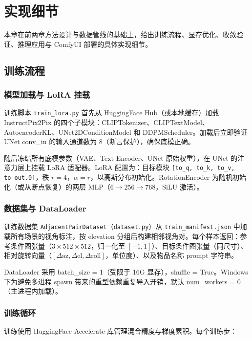 \chapter{实现细节}

本章在前两章方法设计与数据管线的基础上，给出训练流程、显存优化、收敛验证、推理应用与 ComfyUI 部署的具体实现细节。

\section{训练流程}

\subsection{模型加载与 LoRA 挂载}

训练脚本 \texttt{train\_lora.py} 首先从 HuggingFace Hub（或本地缓存）加载 InstructPix2Pix 的四个子模块：CLIPTokenizer、CLIPTextModel、AutoencoderKL、UNet2DConditionModel 和 DDPMScheduler。加载后立即验证 UNet conv\_in 的输入通道数为 8（断言保护），确保底模正确。

随后冻结所有底模参数（VAE、Text Encoder、UNet 原始权重），在 UNet 的注意力层上挂载 LoRA 适配器。LoRA 配置为：目标模块 \texttt{[to\_q, to\_k, to\_v, to\_out.0]}，秩 $r = 4$，$\alpha = r$，以高斯分布初始化。RotationEncoder 为随机初始化（或从断点恢复）的两层 MLP（$6 \to 256 \to 768$，SiLU 激活）。

\subsection{数据集与 DataLoader}

训练数据集 \texttt{AdjacentPairDataset}（\texttt{dataset.py}）从 \texttt{train\_manifest.json} 中加载所有场景的视角标注，按 elevation 分组后构建相邻视角对。每个样本返回：参考条件图张量（$3 \times 512 \times 512$，归一化至 $[-1, 1]$）、目标条件图张量（同尺寸）、相对旋转向量（$[\Delta\text{az}, \Delta\text{el}, \Delta\text{roll}]$，单位度）、以及物品名称 prompt 字符串。

DataLoader 采用 batch\_size = 1（受限于 16G 显存），shuffle = True。Windows 下为避免多进程 spawn 带来的重型依赖重复导入开销，默认 num\_workers = 0（主进程内加载）。

\subsection{训练循环}

训练使用 HuggingFace Accelerate 库管理混合精度与梯度累积。每个训练步：

